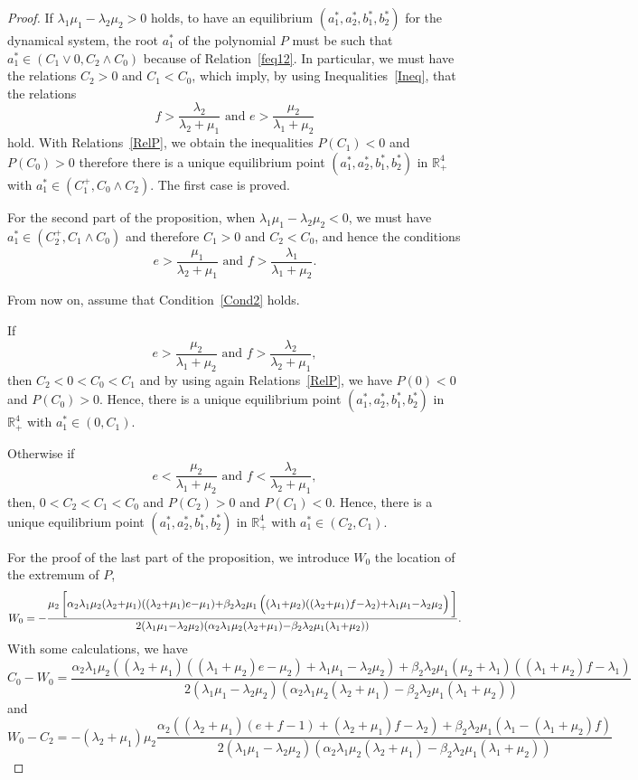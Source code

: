 \documentclass[english]{amsart}
\newcommand{\R}{\ensuremath{\mathbb{R}}}
\numberwithin{proposition}{section}
\begin{document}
\begin{proof}
If $\lambda_1\mu_1-\lambda_2\mu_2>0$ holds, to have an equilibrium $(a_1^*,a_2^*,b_1^*,b_2^*)$ for the dynamical system, the root $a_1^*$ of the polynomial $P$ must be  such that  $a_1^*{\in}(C_1{\vee}0,C_2{\wedge}C_0)$ because of Relation~\eqref{feq12}.  In particular, we must have the relations $C_2{>}0$ and $C_1{<}C_0$, which imply, by using Inequalities~\eqref{Ineq}, that the relations
\[
f> \frac{\lambda_2}{\lambda_2{+}\mu_1} \text{ and } e >\frac{\mu_2}{\lambda_1{+}\mu_2}
\]
hold. With Relations~\eqref{RelP}, we obtain the inequalities  $P(C_1){<}0$  and $P(C_0){>}0$ therefore there is a unique equilibrium point $(a_1^*,a_2^*,b_1^*,b_2^*)$ in $\R_+^4$ with $a_1^*{\in}(C_1^+,C_0{\wedge}C_2)$. The first case is proved. 


For the second part of the proposition, when $\lambda_1\mu_1{-}\lambda_2\mu_2{<}0$, we must have $a_1^*{\in}(C_2^+,C_1{\wedge}C_0)$ and therefore $C_1{>}0$ and $C_2{<}C_0$, and hence the conditions
\[
e>\frac{\mu_1}{\lambda_2{+}\mu_1} \text{ and }f>\frac{\lambda_1}{\lambda_1{+}\mu_2}.
\]

From now on, assume that Condition~\eqref{Cond2} holds.

If
\[
e> \frac{\mu_2}{\lambda_1{+}\mu_2} \text{ and } f> \frac{\lambda_2}{\lambda_2{+}\mu_1},
\]
then  $C_2{<}0{<}C_0{<}C_1$ and by using again Relations~\eqref{RelP}, we have $P(0){<}0$ and $P(C_0){>}0$. Hence, there is a unique equilibrium point $(a_1^*,a_2^*,b_1^*,b_2^*)$ in $\R_+^4$ with $a_1^*{\in}(0,C_1)$. 

Otherwise if
\[
e< \frac{\mu_2}{\lambda_1{+}\mu_2} \text{ and } f< \frac{\lambda_2}{\lambda_2{+}\mu_1},
\]
then,  $0{<}C_2{<}C_1{<}C_0$ and $P(C_2){>}0$ and $P(C_1){<}0$. Hence, there is a unique equilibrium point $(a_1^*,a_2^*,b_1^*,b_2^*)$ in $\R_+^4$ with $a_1^*{\in}(C_2,C_1)$. 

For the proof of the last part of the proposition, we introduce $W_0$ the location of the extremum of $P$,
 \[
 W_0=-\frac{\mu_2\left[\rule{0mm}{5mm}\alpha_2\lambda_1\mu_2(\lambda_2{+}\mu_1)((\lambda_2{+}\mu_1)e{-}\mu_1){+}\beta_2\lambda_2\mu_1\left(\rule{0mm}{4mm}(\lambda_1{+}\mu_2)((\lambda_2{+}\mu_1)f{-}\lambda_2){+}\lambda_1\mu_1{-}\lambda_2\mu_2\right)\rule{0mm}{5mm}\right]}{2(\lambda_1\mu_1{-}\lambda_2\mu_2)(\alpha_2\lambda_1\mu_2 (\lambda_2{+}\mu_1){-}\beta_2\lambda_2\mu_1(\lambda_1{+}\mu_2))}.
 \]
With some calculations, we have
 \[
 C_0{-}W_0=\frac{\alpha_2\lambda_1\mu_2((\lambda_2{+}\mu_1)((\lambda_1{+}\mu_2)e{-}\mu_2)+\lambda_1\mu_1{-}\lambda_2\mu_2)+ \beta_2\lambda_2\mu_1(\mu_2{+}\lambda_1)((\lambda_1{+}\mu_2)f{-}\lambda_1)}{2(\lambda_1\mu_1{-}\lambda_2\mu_2)(\alpha_2\lambda_1\mu_2 (\lambda_2{+}\mu_1){-}\beta_2\lambda_2\mu_1(\lambda_1{+}\mu_2))}
 \]
 and
  \[
  W_0{-}C_2= -(\lambda_2{+}\mu_1)\mu_2
  \frac{\alpha_2((\lambda_2{+}\mu_1)(e{+}f{-}1){+}(\lambda_2{+}\mu_1)f{-}\lambda_2){+}\beta_2\lambda_2\mu_1(\lambda_1{-}(\lambda_1{+}\mu_2)f)}{2(\lambda_1\mu_1{-}\lambda_2\mu_2)(\alpha_2\lambda_1\mu_2 (\lambda_2{+}\mu_1){-}\beta_2\lambda_2\mu_1(\lambda_1{+}\mu_2))}
  \]


\end{proof}
\end{document}
